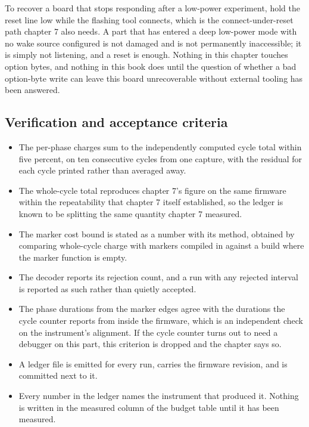 To recover a board that stops responding after a low-power experiment, hold the
reset line low while the flashing tool connects, which is the connect-under-reset
path chapter 7 also needs. A part that has entered a deep low-power mode with no
wake source configured is not damaged and is not permanently inaccessible; it is
simply not listening, and a reset is enough. Nothing in this chapter touches
option bytes, and nothing in this book does until the question of whether a bad
option-byte write can leave this board unrecoverable without external tooling
has been answered.

\subsection*{Verification and acceptance criteria}

\begin{itemize}
\item The per-phase charges sum to the independently computed cycle total within
five percent, on ten consecutive cycles from one capture, with the residual for
each cycle printed rather than averaged away.
\item The whole-cycle total reproduces chapter 7's figure on the same firmware
within the repeatability that chapter 7 itself established, so the ledger is
known to be splitting the same quantity chapter 7 measured.
\item The marker cost bound is stated as a number with its method, obtained by
comparing whole-cycle charge with markers compiled in against a build where the
marker function is empty.
\item The decoder reports its rejection count, and a run with any rejected
interval is reported as such rather than quietly accepted.
\item The phase durations from the marker edges agree with the durations the
cycle counter reports from inside the firmware, which is an independent check on
the instrument's alignment. If the cycle counter turns out to need a debugger on
this part, this criterion is dropped and the chapter says so.
\item A ledger file is emitted for every run, carries the firmware revision, and
is committed next to it.
\item Every number in the ledger names the instrument that produced it. Nothing
is written in the measured column of the budget table until it has been
measured.
\end{itemize}

